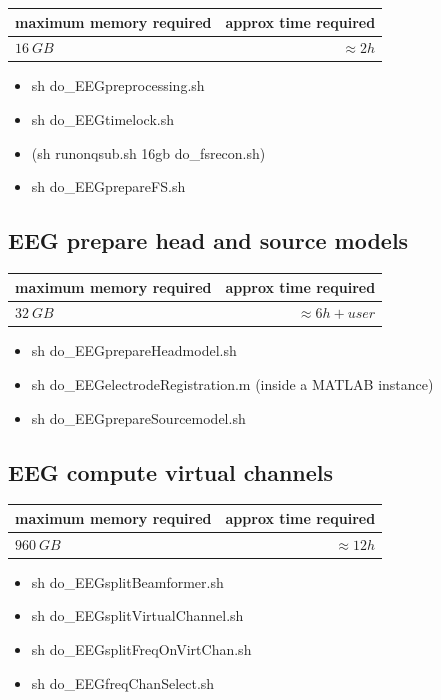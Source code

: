 \documentclass[12pt,a4paper]{scrartcl}
\begin{document}
\begin{table}[h]
\begin{tabular}{l | r}
\toprule
maximum memory required & approx time required\\\toprule
$16~GB$ & $\approx 2h$ \\\bottomrule
\end{tabular}
\end{table}
\begin{itemize}
\item sh do\_EEGpreprocessing.sh
\item sh do\_EEGtimelock.sh
\item (sh runonqsub.sh 16gb do\_fsrecon.sh)
\item sh do\_EEGprepareFS.sh
\end{itemize}

\subsection{EEG prepare head and source models}

\begin{table}[h]
\begin{tabular}{l | r}
\toprule
maximum memory required & approx time required\\\toprule
$32~GB$ & $\approx 6h+user$ \\\bottomrule
\end{tabular}
\end{table}
\begin{itemize}
\item sh do\_EEGprepareHeadmodel.sh
\item sh do\_EEGelectrodeRegistration.m (inside a MATLAB instance)
\item sh do\_EEGprepareSourcemodel.sh
\end{itemize}

\subsection{EEG compute virtual channels}

\begin{table}[h]
\begin{tabular}{l | r}
\toprule
maximum memory required & approx time required\\\toprule
$960~GB$ & $\approx 12h$ \\\bottomrule
\end{tabular}
\end{table}
\begin{itemize}
\item sh do\_EEGsplitBeamformer.sh
\item sh do\_EEGsplitVirtualChannel.sh
\item sh do\_EEGsplitFreqOnVirtChan.sh
\item sh do\_EEGfreqChanSelect.sh
\end{itemize}
\end{document}
